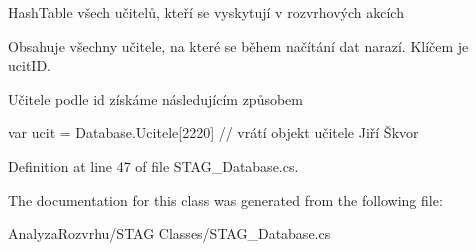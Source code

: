 Hash\+Table všech učitelů, kteří se vyskytují v rozvrhových akcích 

Obsahuje všechny učitele, na které se během načítání dat narazí. Klíčem je ucit\+ID.

Učitele podle id získáme následujícím způsobem 
\begin{DoxyCode}
var ucit = Database.Ucitele[2220] \textcolor{comment}{// vrátí objekt učitele Jiří Škvor}
\end{DoxyCode}
 

Definition at line 47 of file S\+T\+A\+G\+\_\+\+Database.\+cs.



The documentation for this class was generated from the following file\+:\begin{DoxyCompactItemize}
\item 
Analyza\+Rozvrhu/\+S\+T\+A\+G Classes/S\+T\+A\+G\+\_\+\+Database.\+cs\end{DoxyCompactItemize}
